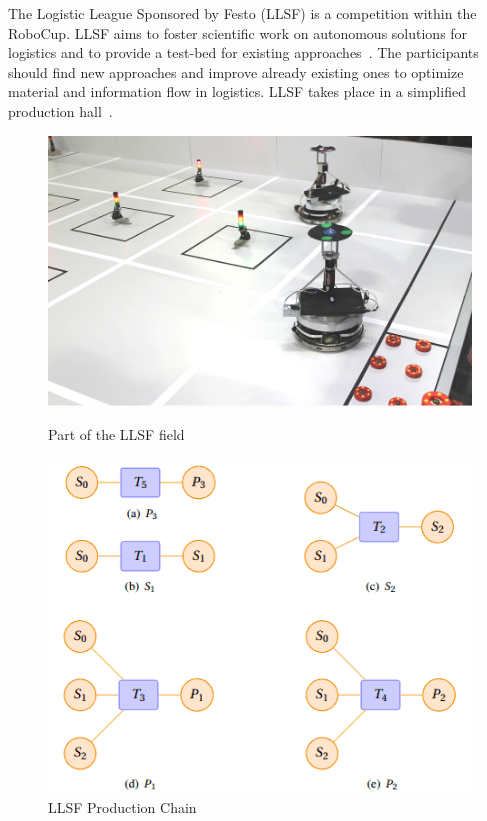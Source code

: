\label{sec:llsf}
The Logistic League Sponsored by Festo (LLSF) is a competition within the RoboCup. LLSF aims to foster scientific work on autonomous solutions for logistics and to provide a test-bed for existing approaches~\cite{LLSFTestbed}. The participants should find new approaches and improve already existing ones to optimize material and information flow in logistics.
LLSF takes place  in a simplified production hall~\cite{LLSFRules}.
\begin{figure}
\begin{minipage}[b]{0.5\linewidth}
\includegraphics[scale=0.23]{pics/llsf}
\caption{Part of the LLSF field}
\label{fig:llsf_field}
\end{minipage}
\quad
\begin{minipage}[b]{0.5\linewidth}
\includegraphics[scale=0.45]{pics/production_chain}
\caption{LLSF Production Chain~\cite{LLSFRules}}
\label{fig:llsf_chain}
\end{minipage}
\end{figure}
